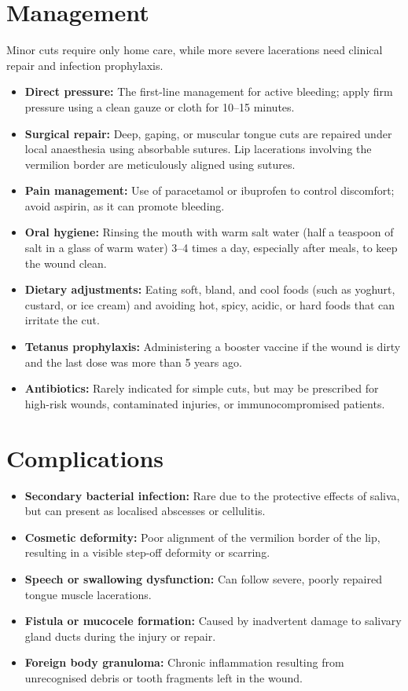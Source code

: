 \section*{Management}
Minor cuts require only home care, while more severe lacerations need clinical repair and infection prophylaxis.
\begin{itemize}
    \item \textbf{Direct pressure:} The first-line management for active bleeding; apply firm pressure using a clean gauze or cloth for 10--15 minutes.
    \item \textbf{Surgical repair:} Deep, gaping, or muscular tongue cuts are repaired under local anaesthesia using absorbable sutures. Lip lacerations involving the vermilion border are meticulously aligned using sutures.
    \item \textbf{Pain management:} Use of paracetamol or ibuprofen to control discomfort; avoid aspirin, as it can promote bleeding.
    \item \textbf{Oral hygiene:} Rinsing the mouth with warm salt water (half a teaspoon of salt in a glass of warm water) 3--4 times a day, especially after meals, to keep the wound clean.
    \item \textbf{Dietary adjustments:} Eating soft, bland, and cool foods (such as yoghurt, custard, or ice cream) and avoiding hot, spicy, acidic, or hard foods that can irritate the cut.
    \item \textbf{Tetanus prophylaxis:} Administering a booster vaccine if the wound is dirty and the last dose was more than 5 years ago.
    \item \textbf{Antibiotics:} Rarely indicated for simple cuts, but may be prescribed for high-risk wounds, contaminated injuries, or immunocompromised patients.
\end{itemize}

\section*{Complications}
\begin{itemize}
    \item \textbf{Secondary bacterial infection:} Rare due to the protective effects of saliva, but can present as localised abscesses or cellulitis.
    \item \textbf{Cosmetic deformity:} Poor alignment of the vermilion border of the lip, resulting in a visible step-off deformity or scarring.
    \item \textbf{Speech or swallowing dysfunction:} Can follow severe, poorly repaired tongue muscle lacerations.
    \item \textbf{Fistula or mucocele formation:} Caused by inadvertent damage to salivary gland ducts during the injury or repair.
    \item \textbf{Foreign body granuloma:} Chronic inflammation resulting from unrecognised debris or tooth fragments left in the wound.
\end{itemize}

